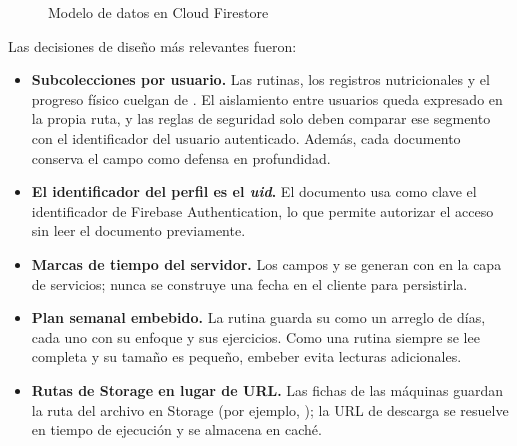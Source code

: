 \begin{figure}[H]
\caption{Modelo de datos en Cloud Firestore}
\label{fig:modelo-datos}
\end{figure}

Las decisiones de diseño más relevantes fueron:

\begin{itemize}
    \item \textbf{Subcolecciones por usuario.} Las rutinas, los registros
    nutricionales y el progreso físico cuelgan de
    . El aislamiento entre usuarios queda expresado
    en la propia ruta, y las reglas de seguridad solo deben comparar ese
    segmento con el identificador del usuario autenticado. Además, cada
    documento conserva el campo  como defensa en
    profundidad.
    \item \textbf{El identificador del perfil es el \emph{uid}.} El documento
     usa como clave el identificador de Firebase
    Authentication, lo que permite autorizar el acceso sin leer el documento
    previamente.
    \item \textbf{Marcas de tiempo del servidor.} Los campos
     y  se generan con
     en la capa de servicios; nunca se construye
    una fecha en el cliente para persistirla.
    \item \textbf{Plan semanal embebido.} La rutina guarda su
     como un arreglo de días, cada uno con su enfoque y
    sus ejercicios. Como una rutina siempre se lee completa y su tamaño es
    pequeño, embeber evita lecturas adicionales.
    \item \textbf{Rutas de Storage en lugar de URL.} Las fichas de las
    máquinas guardan la ruta del archivo en Storage (por ejemplo,
    ); la URL de descarga se
    resuelve en tiempo de ejecución y se almacena en caché.
\end{itemize}

